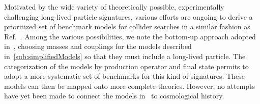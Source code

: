 Motivated by the wide variety of theoretically possible, experimentally challenging long-lived particle signatures, various efforts are ongoing to derive a prioritized set of benchmark models for collider searches in a similar fashion as Ref.~\cite{Abercrombie:2015wmb}. Among the various possibilities, we note the bottom-up approach adopted in~\cite{Buchmueller:2017uqu}, choosing masses and couplings for the models described in~\ref{sub:simplifiedModels} so that they must include a long-lived particle. The categorization of the models by production operator and final state permits to adopt a more systematic set of benchmarks for this kind of signatures. These models can then be mapped onto more complete theories. However, no attempts have yet been made to connect the models in~\cite{Buchmueller:2017uqu} to cosmological history. 
